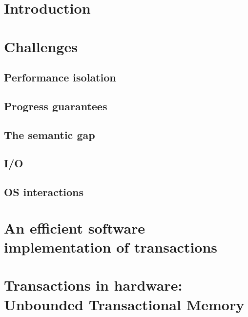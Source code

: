 \documentclass{phd-thesis}
\author{C. Scott Ananian}
\title{\subtitle}
\date{\subdate \\ $ $Revision: 1.18 $ $}
\begin{document}

\frontmatter


\mainmatter
\chapter{Introduction}


\chapter{Challenges}
\section{Performance isolation}
\section{Progress guarantees}\label{sec:progress}
\section{The semantic gap}\label{sec:semantic}
\section{I/O}
\section{OS interactions}

\chapter[Efficient software impl. of trans.]{An efficient software implementation of transactions}\label{sec:softimpl}


\chapter[Transactions in hardware]{Transactions in hardware: Unbounded Transactional Memory}\label{sec:hardimpl}
\end{document}

